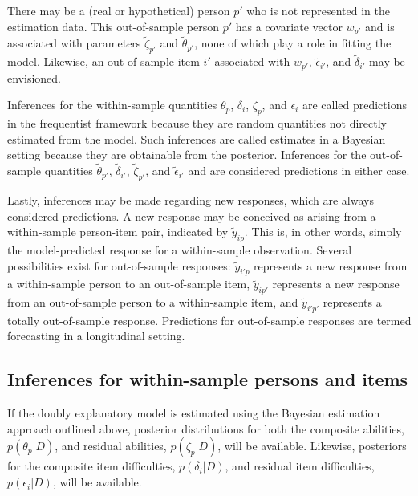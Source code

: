 \documentclass[12pt, letterpaper]{article}
\begin{document}
There may be a (real or hypothetical) person $p'$ who is not represented in the estimation data. This out-of-sample person $p'$ has a covariate vector $w_{p'}$ and is associated with parameters $\tilde \zeta_{p'}$ and $\tilde \theta_{p'}$, none of which play a role in fitting the model. Likewise, an out-of-sample item $i'$ associated with $w_{p'}$, $\tilde \epsilon_{i'}$, and $\tilde \delta_{i'}$ may be envisioned.

Inferences for the within-sample quantities $\theta_p$, $\delta_i$, $\zeta_p$, and $\epsilon_i$ are called predictions in the frequentist framework because they are random quantities not directly estimated from the model. Such inferences are called estimates in a Bayesian setting because they are obtainable from the posterior. Inferences for the out-of-sample quantities $\tilde \theta_{p'}$, $\tilde \delta_{i'}$, $\tilde \zeta_{p'}$, and $\tilde \epsilon_{i'}$ and are considered predictions in either case.

Lastly, inferences may be made regarding new responses, which are always considered predictions. A new response may be conceived as arising from a within-sample person-item pair, indicated by $\tilde y_{ip}$. This is, in other words, simply the model-predicted response for a within-sample observation. Several possibilities exist for out-of-sample responses: $\tilde y_{i'p}$ represents a new response from a within-sample person to an out-of-sample item, $\tilde y_{ip'}$ represents a new response from an out-of-sample person to a within-sample item, and $\tilde y_{i'p'}$ represents a totally out-of-sample response. Predictions for out-of-sample responses are termed forecasting in a longitudinal setting.


\subsection{Inferences for within-sample persons and items}

If the doubly explanatory model is estimated using the Bayesian estimation approach outlined above, posterior distributions for both the composite abilities, $p(\theta_p | D)$, and residual abilities, $p(\zeta_p | D)$, will be available. Likewise, posteriors for the composite item difficulties, $p(\delta_i | D)$, and residual item difficulties, $p(\epsilon_i | D)$, will be available. 
\end{document}
